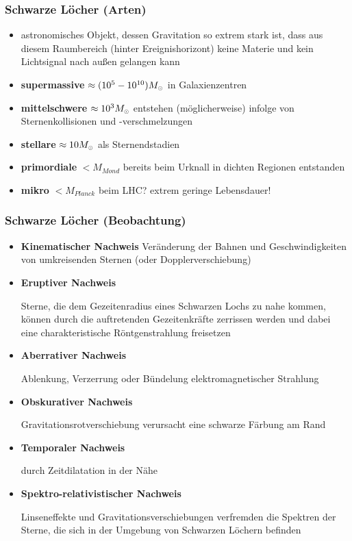 \documentclass{beamer}
\begin{document}
\begin{frame}\frametitle{Schwarze Löcher (Arten)}

\begin{itemize}
\item astronomisches Objekt, dessen Gravitation so extrem stark ist, dass aus diesem Raumbereich (hinter Ereignishorizont) keine Materie und kein Lichtsignal nach außen gelangen kann
\item \textbf{supermassive} $\approx (10^5 - 10^{10}) M_{\tiny\astrosun}$ in Galaxienzentren
\item \textbf{mittelschwere} $\approx 10^3 M_{\tiny\astrosun}$ entstehen (möglicherweise) infolge von Sternenkollisionen und -verschmelzungen
\item \textbf{stellare} $\approx 10 M_{\tiny\astrosun}$ als Sternendstadien
\item \textbf{primordiale} $< M_{Mond}$ bereits beim Urknall in dichten Regionen entstanden
\item \textbf{mikro} $< M_{Planck}$ beim LHC? extrem geringe Lebensdauer! 
\end{itemize}

\end{frame}

\begin{frame}\frametitle{Schwarze Löcher (Beobachtung)}

{\fontsize{10}{10} \selectfont

\begin{itemize}

\item \textbf{Kinematischer Nachweis} Veränderung der Bahnen und Geschwindigkeiten von umkreisenden Sternen (oder Dopplerverschiebung)

\item \textbf{Eruptiver Nachweis}

Sterne, die dem Gezeitenradius eines Schwarzen Lochs zu nahe kommen, können durch die auftretenden Gezeitenkräfte zerrissen werden und dabei eine charakteristische Röntgenstrahlung freisetzen

\item \textbf{Aberrativer Nachweis}

Ablenkung, Verzerrung oder Bündelung elektromagnetischer Strahlung

\item \textbf{Obskurativer Nachweis}

Gravitationsrotverschiebung verursacht eine schwarze Färbung am Rand

\item \textbf{Temporaler Nachweis}

durch Zeitdilatation in der Nähe

\item \textbf{Spektro-relativistischer Nachweis}

Linseneffekte und Gravitationsverschiebungen verfremden die Spektren der Sterne, die sich in der Umgebung von Schwarzen Löchern befinden
\end{itemize}

}

\end{frame}
\end{document}
